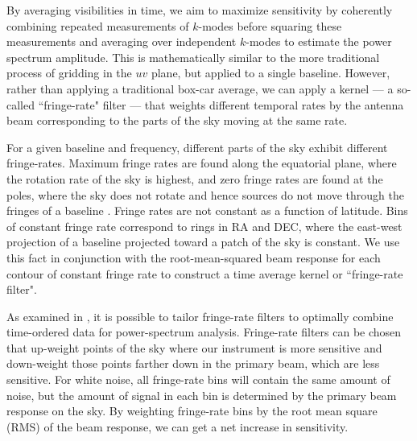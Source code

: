 \documentclass[twocolumn,numberedappendix]{emulateapj} \shorttitle{New Limits on the 21 cm Power Spectrum at $z=8.4$}
\begin{document}
By averaging visibilities in time, we aim to maximize sensitivity
by coherently combining repeated measurements
of $k$-modes 
before squaring these measurements and averaging over independent $k$-modes
to estimate the power spectrum amplitude.
This is mathematically similar to the more traditional
process of gridding in the $uv$ plane, but applied to a single baseline.
However, rather than applying a traditional box-car average, we can apply a
kernel --- a so-called ``fringe-rate" filter --- that weights different temporal
rates by the antenna beam corresponding to the parts of the sky moving at the
same rate.

For a given baseline and frequency, different parts of the sky
exhibit different fringe-rates.  Maximum fringe rates are found along the
equatorial plane, where the rotation rate of the sky is highest, and zero
fringe rates are found at the poles, where the sky does not rotate and hence
sources do not move through the fringes of a baseline \citep{parsons_backer2009}.
Fringe rates are not constant as a function of latitude. Bins of
constant fringe rate correspond to rings in RA and DEC, where the east-west
projection of a baseline projected toward a patch of the sky is constant.  We
use this fact in conjunction with the root-mean-squared beam response for each
contour of constant fringe rate to construct a time average kernel or
``fringe-rate filter".


%

As examined in \citet{parsons_et_al2015}, it is possible to tailor fringe-rate filters
to optimally combine time-ordered data for power-spectrum analysis.
Fringe-rate filters can be chosen that
up-weight points of the sky where our instrument is more sensitive and down-weight
those points farther down in the primary beam, which are less sensitive.
For white noise,
all fringe-rate bins will contain the same amount of noise, but the amount of signal
in each bin is determined by the primary beam response on the sky.
By weighting fringe-rate
bins by the root mean square (RMS) of the beam response, we can get a net increase in sensitivity.  
\end{document}
